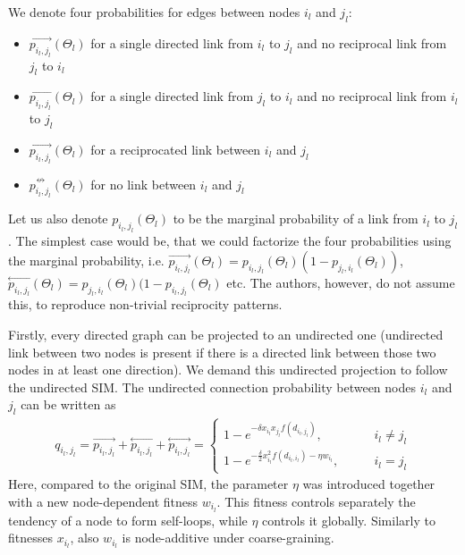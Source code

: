 We denote four probabilities for edges between nodes $i_l$ and $j_l$:
\begin{itemize}
    \item $\overset\rightarrow{p_{i_l,j_l}}(\Theta_l)$ for a single directed link from $i_l$ to $j_l$ and no reciprocal link from $j_l$ to $i_l$
    \item $\overset\leftarrow{p_{i_l,j_l}}(\Theta_l)$ for a single directed link from $j_l$ to $i_l$ and no reciprocal link from $i_l$ to $j_l$
    \item $\overset\leftrightarrow{p_{i_l,j_l}}(\Theta_l)$ for a reciprocated link between $i_l$ and $j_l$
    \item $\overset{\not\leftrightarrow}{p_{i_l,j_l}}(\Theta_l)$ for no link between $i_l$ and $j_l$
\end{itemize}
Let us also denote $p_{i_l,j_l}(\Theta_l)$ to be the marginal probability of a link from $i_l$ to $j_l$. The simplest case would be, that we could factorize the four probabilities using the marginal probability, i.e. $\overset\rightarrow{p_{i_l,j_l}}(\Theta_l) = p_{i_l,j_l}(\Theta_l)(1 - p_{j_l,i_l}(\Theta_l))$, $\overset\leftarrow{p_{i_l,j_l}}(\Theta_l) = p_{j_l,i_l}(\Theta_l)(1 - p_{i_l,j_l}(\Theta_l)$ etc. The authors, however, do not assume this, to reproduce non-trivial reciprocity patterns. 

Firstly, every directed graph can be projected to an undirected one (undirected link between two nodes is present if there is a directed link between those two nodes in at least one direction). We demand this undirected projection to follow the undirected SIM. The undirected connection probability between nodes $i_l$ and $j_l$ can be written as 
\begin{align}
    q_{i_l,j_l} = \overset\rightarrow{p_{i_l,j_l}} + \overset\leftarrow{p_{i_l,j_l}} + \overset\leftrightarrow{p_{i_l,j_l}} = 
    \begin{cases}
        1 - e^{-\delta x_{i_l}x_{j_l}f(d_{i_l,j_l})}, \qquad &i_l \neq j_l\\
        1 - e^{-\frac{\delta}{2}x_{i_l}^2f(d_{i_l,i_l}) - \eta w_{i_l}}, \qquad &i_l = j_l
    \end{cases}
\end{align}
Here, compared to the original SIM, the parameter $\eta$ was introduced together with a new node-dependent fitness $w_{i_l}$. This fitness controls separately the tendency of a node to form self-loops, while $\eta$ controls it globally. Similarly to fitnesses $x_{i_l}$, also $w_{i_l}$ is node-additive under coarse-graining. 

